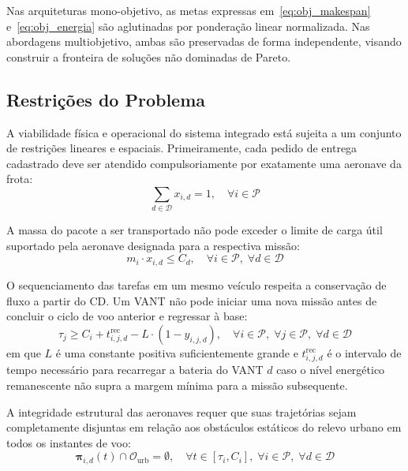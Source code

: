 Nas arquiteturas mono-objetivo, as metas expressas em~\eqref{eq:obj_makespan} e~\eqref{eq:obj_energia} são aglutinadas por ponderação linear normalizada. Nas abordagens multiobjetivo, ambas são preservadas de forma independente, visando construir a fronteira de soluções não dominadas de Pareto.

\subsection{Restrições do Problema}

A viabilidade física e operacional do sistema integrado está sujeita a um conjunto de restrições lineares e espaciais. Primeiramente, cada pedido de entrega cadastrado deve ser atendido compulsoriamente por exatamente uma aeronave da frota:
\begin{equation}\label{eq:restricao_atendimento_unico}
\sum_{d \in \mathcal{D}} x_{i, d} = 1, \quad \forall i \in \mathcal{P}
\end{equation}

A massa do pacote a ser transportado não pode exceder o limite de carga útil suportado pela aeronave designada para a respectiva missão:
\begin{equation}\label{eq:restricao_capacidade_carga}
m_i \cdot x_{i, d} \le C_d, \quad \forall i \in \mathcal{P}, \; \forall d \in \mathcal{D}
\end{equation}

O sequenciamento das tarefas em um mesmo veículo respeita a conservação de fluxo a partir do CD. Um VANT não pode iniciar uma nova missão antes de concluir o ciclo de voo anterior e regressar à base:
\begin{equation}\label{eq:restricao_continuidade_tempo}
\tau_j \ge C_i + t^{\text{rec}}_{i, j, d} - L \cdot (1 - y_{i, j, d}), \quad \forall i \in \mathcal{P}, \; \forall j \in \mathcal{P}, \; \forall d \in \mathcal{D}
\end{equation}
em que $L$ é uma constante positiva suficientemente grande e $t^{\text{rec}}_{i, j, d}$ é o intervalo de tempo necessário para recarregar a bateria do VANT $d$ caso o nível energético remanescente não supra a margem mínima para a missão subsequente.

A integridade estrutural das aeronaves requer que suas trajetórias sejam completamente disjuntas em relação aos obstáculos estáticos do relevo urbano em todos os instantes de voo:
\begin{equation}\label{eq:restricao_obstaculos_estaticos}
\boldsymbol{\pi}_{i, d}(t) \cap \mathcal{O}_{\text{urb}} = \emptyset, \quad \forall t \in [\tau_i, C_i], \; \forall i \in \mathcal{P}, \; \forall d \in \mathcal{D}
\end{equation}

